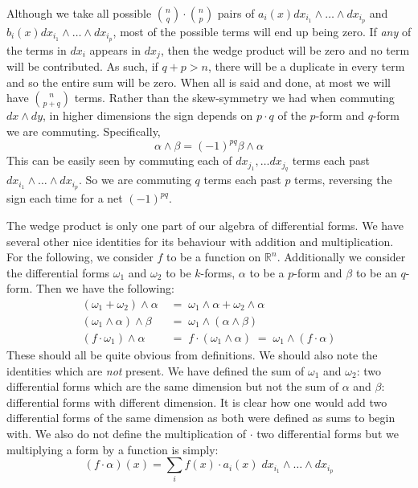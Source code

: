 Although we take all possible $\binom{n}{q} \cdot \binom{n}{p}$ pairs of 
$a_i (x) dx_{i_1} \wedge \ldots \wedge dx_{i_p}$ and $b_i (x) dx_{i_1} \wedge \ldots \wedge dx_{i_p}$,
most of the possible terms will end up being zero.
If \emph{any} of the terms in $dx_{i}$ appears in $dx_{j}$, then the wedge product will be zero 
and no term will be contributed.
As such, if $q+p > n$, there will be a duplicate in every term and so the entire sum will be zero.
When all is said and done, at most we will have $\binom{n}{p+q}$ terms.
Rather than the skew-symmetry we had when commuting $dx \wedge dy$, in higher dimensions the sign depends on 
$p \cdot q$ of the $p$-form and $q$-form we are commuting.
Specifically, 
\begin{equation}
	\alpha \wedge \beta = (-1)^{pq} \beta \wedge \alpha
\end{equation}
This can be easily seen by commuting each of $dx_{j_1}, \ldots dx_{j_q}$ terms each past 
$dx_{i_1}\wedge \ldots \wedge dx_{i_p}$. 
So we are commuting $q$ terms each past $p$ terms, reversing the sign each time for a net $(-1)^{pq}$.


The wedge product is only one part of our algebra of differential forms.
We have several other nice identities for its behaviour with addition and multiplication.
For the following, we consider $f$ to be a function on $\mathbb{R}^n$.
Additionally we consider the differential forms $\omega_1$ and $\omega_2$ to be $k$-forms, $\alpha$ to be a $p$-form
 and $\beta$ to be an $q$-form.
Then we have the following:
\begin{align}
	(\omega_1 + \omega_2) \wedge \alpha  & \;=\; \omega_1 \wedge \alpha + \omega_2 \wedge \alpha \\
	(\omega_1 \wedge \alpha) \wedge \beta & \;=\; \omega_1 \wedge ( \alpha \wedge \beta ) \\
	(f \cdot \omega_1) \wedge \alpha & \;=\;  f \cdot (\omega_1 \wedge \alpha) \;=\; \omega_1 \wedge (f \cdot \alpha)
\end{align}
These should all be quite obvious from definitions. 
We should also note the identities which are \emph{not} present.
We have defined the sum of $\omega_1$ and $\omega_2$: two differential forms which are the same dimension but not
the sum of $\alpha$ and $\beta$: differential forms with different dimension.
It is clear how one would add two differential forms of the same dimension as both were defined as sums to begin with.
We also do not define the multiplication of $\cdot$ two differential forms but we multiplying a form by a function is simply:
\begin{equation}
	(f \cdot \alpha) (x) = \sum_i f(x)\cdot a_i(x) \; dx_{i_1} \wedge \ldots \wedge dx_{i_p}
\end{equation}


